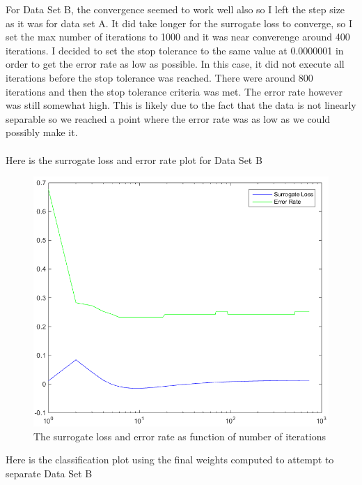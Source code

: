 \documentclass[twoside,11pt]{article}
\theoremstyle{definition}
\begin{document}
\newpage
For Data Set B, the convergence seemed to work well also so I left the step size as it was for data set A. It did take longer for the surrogate loss to converge, so I set the max number of iterations to 1000 and it was near converenge around 400 iterations. I decided to set the stop tolerance to the same value at 0.0000001 in order to get the error rate as low as possible. In this case, it did not execute all iterations before the stop tolerance was reached. There were around 800 iterations and then the stop tolerance criteria was met. The error rate however was still somewhat high. This is likely due to the fact that the data is not linearly separable so we reached a point where the error rate was as low as we could possibly make it. \\
\\
Here is the surrogate loss and error rate plot for Data Set B\\
\begin{figure}[h]
\centering
\includegraphics[width=5 in]{prob1fPlotB1.png}
\caption{The surrogate loss and error rate as function of number of iterations}
\end{figure}

\newpage

Here is the classification plot using the final weights computed to attempt to separate Data Set B\\
\end{document}

